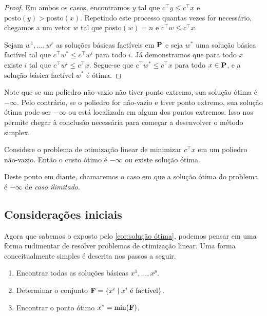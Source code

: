 \begin{proof}
    Em ambos os casos, encontramos $ y$ tal que $c^\intercal y \leq c^\intercal x$ e $\mathrm{posto}( y) > \mathrm{posto}( x)$. Repetindo este processo quantas vezes for necessário, chegamos a um vetor $w$ tal que $\mathrm{posto}(w) = n$ e $c^\intercal w \leq c^\intercal x$.

    Sejam $w^1,\ldots,w^r$ as soluções básicas factíveis em $\vb P$ e seja $w^*$ uma solução básica factível tal que $c^\intercal w^* \leq c^\intercal w^i$ para todo $i$. Já demonstramos que para todo $ x$ existe $i$ tal que ${c^\intercal w^i \leq c^\intercal x}$. Segue-se que ${c^\intercal w^* \leq c^\intercal x}$ para todo $x \in \vb P$, e a solução básica factível $w^*$ é ótima.
\end{proof}

Note que se um poliedro não-vazio não tiver ponto extremo, sua solução ótima é $-\infty$. Pelo contrário, se o poliedro for não-vazio e tiver ponto extremo, sua solução ótima pode ser $-\infty$ ou está localizada em algum dos pontos extremos. Isso nos permite chegar à conclusão necessária para começar a desenvolver o método simplex.

\begin{cor}\label{cor:solução ótima}
Considere o problema de otimização linear de minimizar $c^\intercal x$ em um poliedro não-vazio. Então o custo ótimo é $-\infty$ ou existe solução ótima.
\end{cor}

Deste ponto em diante, chamaremos o caso em que a solução ótima do problema é $-\infty$ de \emph{caso ilimitado}.

\subsection{Considerações iniciais}

Agora que sabemos o exposto pelo \cref{cor:solução ótima}, podemos pensar em uma forma rudimentar de resolver problemas de otimização linear. Uma forma conceitualmente simples é descrita nos passos a seguir.

\begin{enumerate}
    \item Encontrar todas as soluções básicas $x^1,\ldots,x^p$.
    \item Determinar o conjunto $\vb{F} = \{x^i \mid x^i \text{ é factível}\}$.
    \item Encontrar o ponto ótimo $x^* = \min(\vb F)$.
\end{enumerate}

